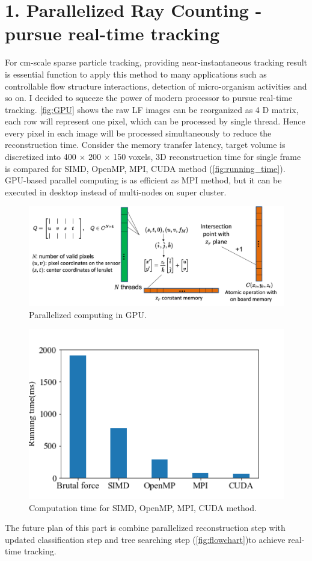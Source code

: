 \documentclass[draftthesis,fullpage]{uiucthesis}
\begin{document}
\section*{1. Parallelized Ray Counting - pursue real-time tracking}
For cm-scale sparse particle tracking, providing near-instantaneous tracking result is essential function to apply this method to many applications such as controllable flow structure interactions, detection of micro-organism activities and so on. I decided to squeeze the power of modern processor to pursue real-time tracking. 
\autoref{fig:GPU} shows the raw LF images can be reorganized as 4 D matrix, each row will represent one pixel, which can be processed by single thread. Hence every pixel in each image will be processed simultaneously to reduce the reconstruction time. Consider the memory transfer latency, target volume is discretized into 400 $\times$ 200 $\times$ 150 voxels, 3D reconstruction time for single frame is compared for SIMD, OpenMP, MPI, CUDA method (\autoref{fig:running_time}). GPU-based parallel computing is as efficient as MPI method, but it can be executed in desktop instead of multi-nodes on super cluster.
\begin{figure}[h]
  \centerline{\includegraphics[width = 0.9\linewidth]{fig/GPU.png}} 
  \caption{Parallelized computing in GPU.}
\label{fig:GPU}
\end{figure}

\begin{figure}[h]
  \centerline{\includegraphics[width = 0.7\linewidth]{python/running_time.png}} 
  \caption{Computation time for SIMD, OpenMP, MPI, CUDA method.}
\label{fig:running_time}
\end{figure}
The future plan of this part is combine parallelized reconstruction step with updated classification step and tree searching step (\autoref{fig:flowchart})to achieve real-time tracking.
\end{document}
